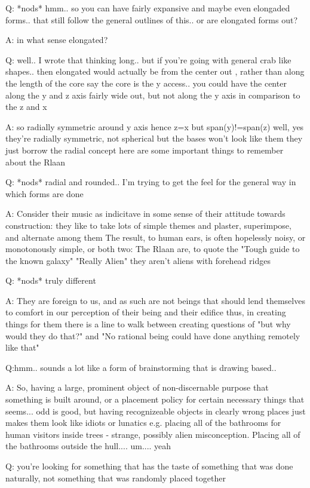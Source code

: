 Q: *nods* hmm.. so you can have fairly expansive and maybe even
elongaded forms.. that still follow the general outlines of this.. or
are elongated forms out?

A: in what sense elongated?

Q: well.. I wrote that thinking long.. but if you're going with
general crab like shapes.. then elongated would actually be from the
center out , rather than along the length of the core say the core is
the y access.. you could have the center along the y and z axis fairly
wide out, but not along the y axis in comparison to the z and x

A: so radially symmetric around y axis hence z=x but span(y)!=span(z)
well, yes they're radially symmetric, not spherical but the bases
won't look like them they just borrow the radial concept here are some
important things to remember about the Rlaan

Q: *nods* radial and rounded.. I'm trying to get the feel for the
general way in which forms are done

A: Consider their music as indicitave in some sense of their attitude
towards construction: they like to take lots of simple themes and
plaster, superimpose, and alternate among them The result, to human
ears, is often hopelessly noisy, or monotonously simple, or both two:
The Rlaan are, to quote the "Tough guide to the known galaxy" "Really
Alien" they aren't aliens with forehead ridges

Q: *nods* truly different

A: They are foreign to us, and as such are not beings that should lend
themselves to comfort in our perception of their being and their
edifice thus, in creating things for them there is a line to walk
between creating questions of "but why would they do that?" and "No
rational being could have done anything remotely like that"

Q:hmm.. sounds a lot like a form of brainstorming that is drawing
based..

A: So, having a large, prominent object of non-discernable purpose
that something is built around, or a placement policy for certain
necessary things that seems... odd is good, but having recognizeable
objects in clearly wrong places just makes them look like idiots or
lunatics e.g. placing all of the bathrooms for human visitors inside
trees - strange, possibly alien misconception. Placing all of the
bathrooms outside the hull.... um.... yeah

Q: you're looking for something that has the taste of something that
was done naturally, not something that was randomly placed together

